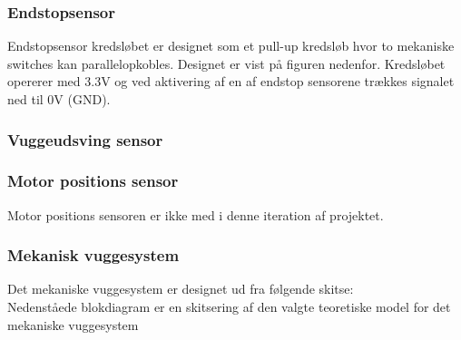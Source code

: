 
\subsubsection{Endstopsensor}\label{Vuggesystem: Design_ES} 
Endstopsensor kredsløbet er designet som et pull-up kredsløb hvor to mekaniske switches kan parallelopkobles. Designet er vist på figuren nedenfor.
Kredsløbet opererer med 3.3V og ved aktivering af en af endstop sensorene trækkes signalet ned til 0V (GND).
\subsubsection{Vuggeudsving sensor}
\label{Vuggesystem: Design_Vugggeudsving_sensor} 


\subsubsection{Motor positions sensor}
Motor positions sensoren er ikke med i denne iteration af projektet.
\subsubsection{Mekanisk vuggesystem}\label{Vuggesystem: Design_MekVug} 
Det mekaniske vuggesystem er designet ud fra følgende skitse: \\



Nedenståede blokdiagram er en skitsering af den valgte teoretiske model for det mekaniske vuggesystem


